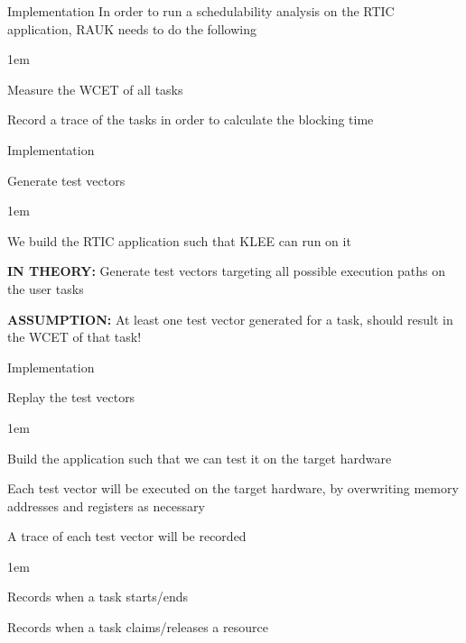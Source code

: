\begin{frame}{Implementation}
    In order to run a schedulability analysis on the RTIC application,
    RAUK needs to do the following
    \begin{itemize-size}{1em}
        \item Measure the WCET of all tasks
        \item Record a trace of the tasks in order to
        calculate the blocking time
    \end{itemize-size}     
\end{frame}

\begin{frame}{Implementation}
    \begin{block}{Generate test vectors}
        \begin{itemize-size}{1em}
            \item We build the RTIC application such that KLEE can run on it
            \item \textbf{IN THEORY:} Generate test vectors targeting all possible
            execution paths on the user tasks
            \item \textbf{ASSUMPTION:} At least one test vector generated for a task, should
            result in the WCET of that task!
        \end{itemize-size}  
    \end{block}
\end{frame}

\begin{frame}{Implementation}
    \begin{block}{Replay the test vectors}
        \begin{itemize-size}{1em}
            \item Build the application such that we can test it on the target hardware
            \item Each test vector will be executed on the target hardware, by overwriting
            memory addresses and registers as necessary
            \item A trace of each test vector will be recorded
            \begin{itemize-size}{1em}
                \item Records when a task starts/ends
                \item Records when a task claims/releases a resource
            \end{itemize-size}
        \end{itemize-size}  
    \end{block}
\end{frame}

